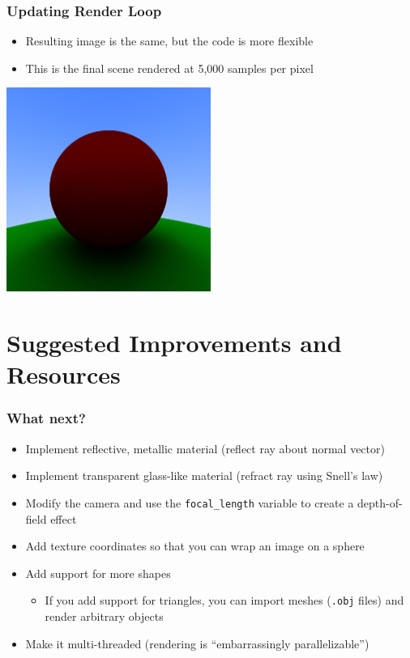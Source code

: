 \documentclass{beamer}
\begin{document}
\begin{frame}
	\frametitle{Updating Render Loop}
	\begin{itemize}
		\item Resulting image is the same, but the code is more flexible
		\item This is the final scene rendered at 5,000 samples per pixel
	\end{itemize}
	\begin{center}
		\includegraphics[width=0.5\textwidth]{media/final.png}
	\end{center}
\end{frame}

\section{Suggested Improvements and Resources}

\begin{frame}
	\frametitle{What next?}
	\begin{itemize}
		\item Implement reflective, metallic material (reflect ray about normal vector)
		\item Implement transparent glass-like material (refract ray using Snell's law)
		\item Modify the camera and use the \texttt{focal\_length} variable to create a depth-of-field effect
		\item Add texture coordinates so that you can wrap an image on a sphere
		\item Add support for more shapes
		\begin{itemize}
			\item If you add support for triangles, you can import meshes (\texttt{.obj} files) and render arbitrary objects
		\end{itemize}
		\item Make it multi-threaded (rendering is ``embarrassingly parallelizable'')
	\end{itemize}
\end{frame}
\end{document}
